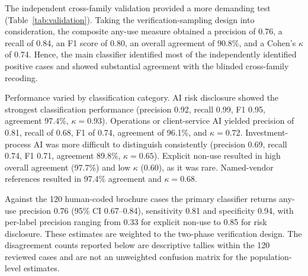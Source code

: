 \documentclass[utf8]{FrontiersinHarvard}
\begin{document}
The independent cross-family validation provided a more demanding test (Table~\ref{tab:validation}). Taking the verification-sampling design into consideration, the composite any-use measure obtained a precision of 0.76, a recall of 0.84, an F1 score of 0.80, an overall agreement of 90.8\%, and a Cohen's $\kappa$ of 0.74. Hence, the main classifier identified most of the independently identified positive cases and showed substantial agreement with the blinded cross-family recoding.

Performance varied by classification category. AI risk disclosure showed the strongest classification performance (precision 0.92, recall 0.99, F1 0.95, agreement 97.4\%, $\kappa = 0.93$). Operations or client-service AI yielded precision of 0.81, recall of 0.68, F1 of 0.74, agreement of 96.1\%, and $\kappa = 0.72$. Investment-process AI was more difficult to distinguish consistently (precision 0.69, recall 0.74, F1 0.71, agreement 89.8\%, $\kappa = 0.65$). Explicit non-use resulted in high overall agreement (97.7\%) and low $\kappa$ (0.60), as it was rare. Named-vendor references resulted in 97.4\% agreement and $\kappa = 0.68$.

Against the 120 human-coded brochure cases the primary classifier returns any-use precision 0.76 (95\% CI 0.67--0.84), sensitivity 0.81 and specificity 0.94, with per-label precision ranging from 0.33 for explicit non-use to 0.85 for risk disclosure. These estimates are weighted to the two-phase verification design. The disagreement counts reported below are descriptive tallies within the 120 reviewed cases and are not an unweighted confusion matrix for the population-level estimates.
\end{document}
